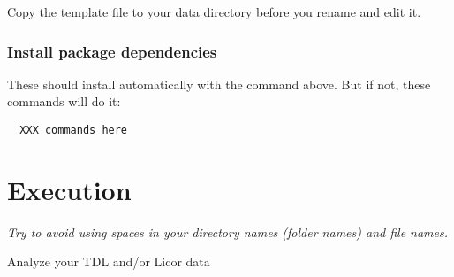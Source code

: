\documentclass[]{article}
\begin{document}
Copy the template file to your data directory before you rename and edit
it.

\hypertarget{install-package-dependencies}{%
\subsubsection{Install package
dependencies}\label{install-package-dependencies}}

These should install automatically with the command above. But if not,
these commands will do it:

\begin{verbatim}
  XXX commands here
\end{verbatim}

\hypertarget{execution}{%
\section{Execution}\label{execution}}

\emph{Try to avoid using spaces in your directory names (folder names)
and file names.}

Analyze your TDL and/or Licor data
\end{document}
